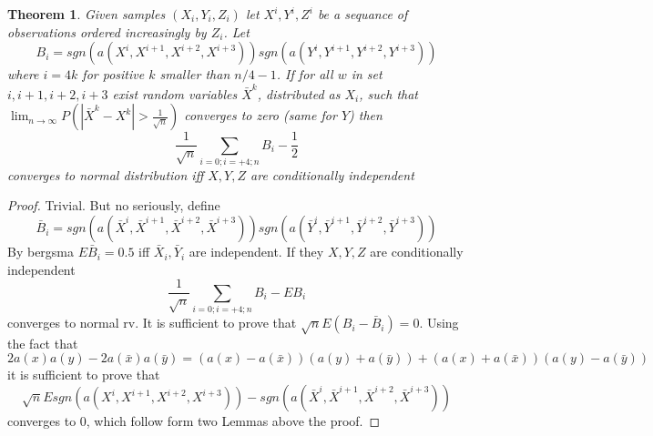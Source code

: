 \documentclass{article}
\newtheorem{Theorem}{Theorem}
\begin{document}
\begin{Theorem}
 Given samples $(X_i,Y_i,Z_i)$ let $X^{i},Y^{i},Z^{i}$ be a sequance of observations ordered increasingly  by $Z_i$. Let
 \[ 
B_i = sgn(a(X^{i},X^{i+1},X^{i+2},X^{i+3})) sgn(a(Y^{i},Y^{i+1},Y^{i+2},Y^{i+3}))  
 \]
where  $i=4k$ for positive $k$ smaller than $n/4-1$. If for all $w$ in set $i,i+1,i+2,i+3$ exist random variables $\bar X^{k}$, distributed as $X_i$, such that  $\lim_{n \to \infty } P(|\bar X^{k} - X^{k}| > \frac{1}{\sqrt n}) $ converges to zero (same for $Y$) then 
\[
 \frac{1}{\sqrt n} \sum_{i=0;i=+4;n} B_i -\frac{1}{2}  
\]
converges to normal distribution iff $X,Y,Z$ are conditionally independent
\end{Theorem}
\begin{proof}
Trivial.  But no seriously, define
\[
 \bar B_i = sgn(a(\bar X^{i},\bar X^{i+1},\bar X^{i+2}, \bar X^{i+3})) sgn(a(\bar Y^{i},\bar Y^{i+1},\bar Y^{i+2},\bar Y^{i+3}))
\]
By bergsma $E \bar B_i = 0.5$ iff $\bar X_i , \bar Y_i$ are independent. If they $X,Y,Z$ are conditionally independent
\[
 \frac{1}{\sqrt n} \sum_{i=0;i=+4;n} B_i -E B_i 
\]
converges to normal rv. It is sufficient to prove that $\sqrt n E (B_i - \bar B_i) =0$.  Using the fact that 
\[
 2a(x)a(y) - 2a(\bar x) a(\bar y) = (a(x) - a(\bar x))(a(y) + a(\bar y)) + (a(x) + a(\bar x))(a(y) - a(\bar y))
\]
it is sufficient to prove that
\[
 \sqrt n E sgn(a(X^{i},X^{i+1},X^{i+2},X^{i+3})) - sgn(a(\bar X^{i},\bar X^{i+1},\bar X^{i+2}, \bar X^{i+3}))
\]
converges to 0, which follow form two Lemmas above the proof.
\end{proof}









% 
\end{document}
